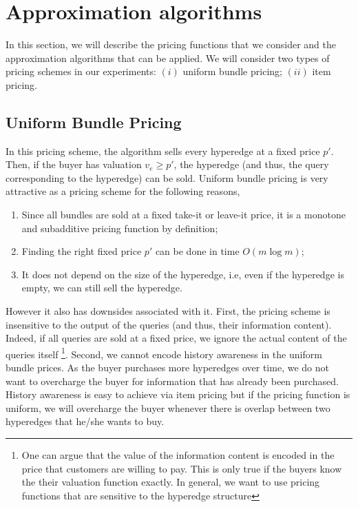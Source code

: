 \section{Approximation algorithms}
\label{section-approxalgo}

In this section, we will describe the pricing functions that we consider and the approximation algorithms that can be applied. We will consider two types of pricing schemes in our experiments: $(i)$ uniform bundle pricing; $(ii)$ item pricing. 

\subsection{Uniform Bundle Pricing} 
\label{subsection-uniformbundle}

In this pricing scheme, the algorithm sells every hyperedge at a fixed price $p'$. Then, if the buyer has valuation $v_e \geq p'$, the hyperedge (and thus, the query corresponding to the hyperedge) can be sold. Uniform bundle pricing is very attractive as a pricing scheme for the following reasons, 

\begin{enumerate}
	\item Since all bundles are sold at a fixed take-it or leave-it price, it is a monotone and subadditive pricing function by definition;
	\item Finding the right fixed price $p'$ can be done in time  $O(m\log m)$;
	\item It does not depend on the size of the hyperedge, i.e, even if the hyperedge is empty, we can still sell the hyperedge.
\end{enumerate}

However it also has downsides associated with it. First, the pricing scheme is insensitive to the output of the queries (and thus, their information content). Indeed, if all queries are sold at a fixed price, we ignore the actual content of the queries itself \footnote{One can argue that the value of the information content is encoded in the price that customers are willing to pay. This is only true if the buyers know the their valuation function exactly. In general, we want to use pricing functions that are sensitive to the hyperedge structure}. Second, we cannot encode history awareness in the uniform bundle prices. As the buyer purchases more hyperedges over time, we do not want to overcharge the buyer for information that has already been purchased. 
History awareness is easy to achieve via item pricing but if the pricing function is uniform, we will overcharge the buyer whenever there is overlap between two hyperedges that he/she wants to buy.


